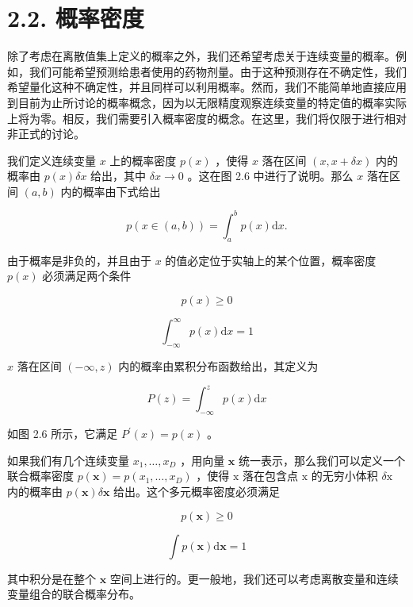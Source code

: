 \documentclass[10pt]{report}
\begin{document}
\section*{2.2. 概率密度}

除了考虑在离散值集上定义的概率之外，我们还希望考虑关于连续变量的概率。例如，我们可能希望预测给患者使用的药物剂量。由于这种预测存在不确定性，我们希望量化这种不确定性，并且同样可以利用概率。然而，我们不能简单地直接应用到目前为止所讨论的概率概念，因为以无限精度观察连续变量的特定值的概率实际上将为零。相反，我们需要引入概率密度的概念。在这里，我们将仅限于进行相对非正式的讨论。

我们定义连续变量 \(x\) 上的概率密度 \(p\left( x\right)\) ，使得 \(x\) 落在区间 \(\left( {x,x + {\delta x}}\right)\) 内的概率由 \(p\left( x\right) {\delta x}\) 给出，其中 \({\delta x} \rightarrow  0\) 。这在图 2.6 中进行了说明。那么 \(x\) 落在区间 \(\left( {a,b}\right)\) 内的概率由下式给出

\[
p\left( {x \in  \left( {a,b}\right) }\right)  = {\int }_{a}^{b}p\left( x\right) \mathrm{d}x. \tag{2.23}
\]

由于概率是非负的，并且由于 \(x\) 的值必定位于实轴上的某个位置，概率密度 \(p\left( x\right)\) 必须满足两个条件

\[
p\left( x\right)  \geq  0 \tag{2.24}
\]

\[
{\int }_{-\infty }^{\infty }p\left( x\right) \mathrm{d}x = 1 \tag{2.25}
\]

\(x\) 落在区间 \(\left( {-\infty ,z}\right)\) 内的概率由累积分布函数给出，其定义为

\[
P\left( z\right)  = {\int }_{-\infty }^{z}p\left( x\right) \mathrm{d}x \tag{2.26}
\]

如图 2.6 所示，它满足 \({P}^{\prime }\left( x\right)  = p\left( x\right)\) 。

如果我们有几个连续变量 \({x}_{1},\ldots ,{x}_{D}\) ，用向量 \(\mathbf{x}\) 统一表示，那么我们可以定义一个联合概率密度 \(p\left( \mathbf{x}\right)  = p\left( {{x}_{1},\ldots ,{x}_{D}}\right)\) ，使得 \(\mathrm{x}\) 落在包含点 \(\mathrm{x}\) 的无穷小体积 \(\delta \mathrm{x}\) 内的概率由 \(p\left( \mathbf{x}\right) \delta \mathbf{x}\) 给出。这个多元概率密度必须满足

\[
p\left( \mathbf{x}\right)  \geq  0 \tag{2.27}
\]

\[
\int p\left( \mathbf{x}\right) \mathrm{d}\mathbf{x} = 1 \tag{2.28}
\]

其中积分是在整个 \(\mathbf{x}\) 空间上进行的。更一般地，我们还可以考虑离散变量和连续变量组合的联合概率分布。
\end{document}
